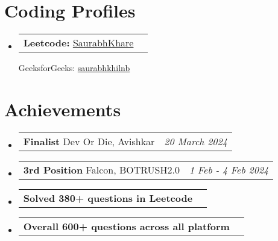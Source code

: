 \documentclass[a4paper,11pt]{article}
\makeatletter
\newcommand{\resumePOR}[3]{
\vspace{0.5mm}\item
    \begin{tabular*}{0.97\textwidth}[t]{l@{\extracolsep{\fill}}r}
        \textbf{#1}\hspace{0.3mm}#2 & \textit{\small{#3}} 
    \end{tabular*}
    \vspace{-2mm}
}
\newcommand{\resumeSubHeadingListStart}{\begin{itemize}[leftmargin=*,labelsep=0mm]}
\newcommand{\resumeSubHeadingListEnd}{\end{itemize}\vspace{2mm}}
\makeatother
\begin{document}

\section{\textbf{Coding Profiles}}
\vspace{-0.4mm}
\resumeSubHeadingListStart
\resumePOR{Leetcode: } %
    {\href{https://leetcode.com/u/SaurabhKhare/}{SaurabhKhare}} %

\resumePOR{GeeksforGeeks: } %
    {\href{https://www.geeksforgeeks.org/user/saurabhkhilnb/}{saurabhkhilnb}} %
    {} 
\resumeSubHeadingListEnd
\vspace{-5mm}



\section{\textbf{Achievements}}
\vspace{-0.4mm}
\resumeSubHeadingListStart
\resumePOR{Finalist } %
    {Dev Or Die, Avishkar} %
    {20 March 2024} %
    
\resumePOR{3rd Position } %
    {Falcon, BOTRUSH2.0} %
    {1 Feb - 4 Feb 2024} %
\resumePOR{Solved 380+ questions in Leetcode } %
    {} %
    {} %

\resumePOR{Overall 600+ questions across all platform }
{}
{}
\resumeSubHeadingListEnd
\vspace{-5mm}



\end{document}
